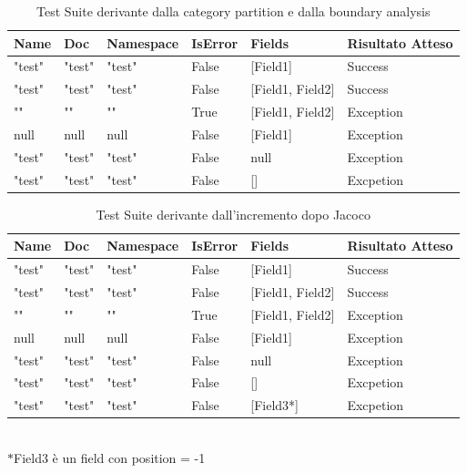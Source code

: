 \documentclass[12pt, a4paper]{article}
\begin{document}
\begin{table}[ht]
  \centering
  \caption[CreateRecord: Test Suite - Category partition]{Test Suite derivante dalla category partition e dalla boundary analysis}
  \begin{tabular}{|l|l|l|l|l|l|}
    \hline
    \textbf{Name} & \textbf{Doc} & \textbf{Namespace}  & \textbf{IsError} & \textbf{Fields} & \textbf{Risultato Atteso} \\
    \hline
    "test" & "test" & "test" & False & [Field1] & Success \\
    "test" & "test" & "test" & False & [Field1, Field2] & Success \\
    "" & "" & "" & True & [Field1, Field2] & Exception \\
    null & null & null & False & [Field1] & Exception \\
    "test" & "test" & "test" & False & null & Exception \\
    "test" & "test" & "test" & False & [] & Excpetion \\

    \hline
  \end{tabular}
  \label{tab:categoryPartition1CreateRecord}
\end{table}


\begin{table}[ht]
  \centering
  \caption[CreateRecord: Test Suite - Adequacy Control Flow]{Test Suite derivante dall'incremento dopo Jacoco}
  \begin{tabular}{|l|l|l|l|l|l|}
    \hline
    \textbf{Name} & \textbf{Doc} & \textbf{Namespace}  & \textbf{IsError} & \textbf{Fields} & \textbf{Risultato Atteso} \\
    \hline
    "test" & "test" & "test" & False & [Field1] & Success \\
    "test" & "test" & "test" & False & [Field1, Field2] & Success \\
    "" & "" & "" & True & [Field1, Field2] & Exception \\
    null & null & null & False & [Field1] & Exception \\
    "test" & "test" & "test" & False & null & Exception \\
    "test" & "test" & "test" & False & [] & Excpetion \\
    "test" & "test" & "test" & False & [Field3*] & Excpetion \\
    \hline
  \end{tabular}
   \\$\ast$Field3 è un field con position = -1
  \label{tab:Jacoco1CreateRecord}
\end{table}
\end{document}
